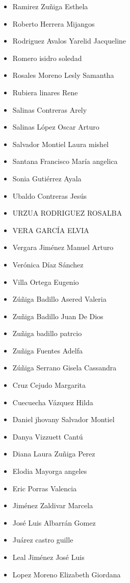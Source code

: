 \begin{spacing}{0.5}
\begin{paracol}{2}
\begin{itemize}
\item Ramirez Zuñiga Esthela
\item Roberto Herrera Mijangos
\item Rodriguez Avalos Yarelid Jacqueline
\item Romero isidro soledad
\item Rosales Moreno Lesly Samantha
\item Rubiera linares Rene
\item Salinas Contreras Arely
\item Salinas López Oscar Arturo
\item Salvador Montiel Laura mishel
\item Santana Francisco María angelica
\item Sonia Gutiérrez Ayala
\item Ubaldo Contreras Jesús
\item URZUA RODRIGUEZ ROSALBA
\item VERA GARCÍA ELVIA
\item Vergara Jiménez Manuel Arturo
\item Verónica Díaz Sánchez
\item Villa Ortega Eugenio
\item Zúñiga Badillo Asered Valeria
\item Zuñiga Badillo Juan De Dios
\item Zuñiga badillo patrcio
\item Zuñiga Fuentes Adelfa
\item Zúñiga Serrano Gisela Cassandra
\item Cruz Cejudo Margarita
\item Cuecuecha Vázquez Hilda
\item Daniel jhovany Salvador Montiel
\item Danya Vizzuett Cantú
\item Diana Laura Zuñiga Perez
\item Elodia Mayorga angeles
\item Eric Porras Valencia
\item Jiménez Zaldivar Marcela
\item José Luis Albarrán Gomez
\item Juárez castro guille
\item Leal Jiménez José Luis
\item Lopez Moreno Elizabeth Giordana
\end{itemize}
\switchcolumn

\end{paracol}
\end{spacing}
